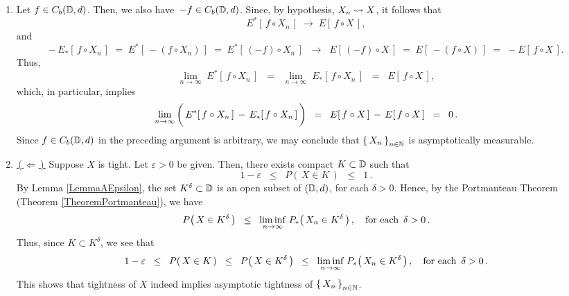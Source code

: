 \begin{enumerate}
\item
	Let $f \in C_{b}(\mathbb{D},d)$. Then, we also have \,$-f \in C_{b}(\mathbb{D},d)$.
	Since, by hypothesis, $X_{n} \rightsquigarrow X$, it follows that
	\begin{equation*}
	E^{*}\!\left[\,f \circ X_{n}\,\right] \;\longrightarrow\; E\!\left[\,f \circ X\,\right],
	\end{equation*}
	and
	\begin{equation*}
	-\,E_{*}\!\left[\,f \circ X_{n}\,\right]
	\;=\; E^{*}\!\left[\,-(f \circ X_{n})\,\right]
	\;=\; E^{*}\!\left[\,(-f) \circ X_{n}\,\right]
	\;\;\longrightarrow\;\;
	E\!\left[\,(-f) \circ X\,\right]
	\;=\; E\!\left[\,-(f \circ X)\,\right]
	\;=\; -E\!\left[\,f \circ X\,\right].
	\end{equation*}
	Thus,
	\begin{equation*}
	\underset{n\rightarrow\infty}{\lim}\;E^{*}\!\left[\,f \circ X_{n}\,\right]
	\;\; = \;\;
	\underset{n\rightarrow\infty}{\lim}\;E_{*}\!\left[\,f \circ X_{n}\,\right]
	\;\; = \;\;
	E\!\left[\,f \circ X\,\right],
	\end{equation*}
	which, in particular, implies
	\begin{equation*}
	\underset{n\rightarrow\infty}{\lim}
		\left(\,
			E^{*}\!\left[\,f \circ X_{n}\,\right]
			\,\overset{{\color{white}+}}{-}\,
			E_{*}\!\left[\,f \circ X_{n}\,\right]
		\,\right)
	\;\; = \;\;
		E\!\left[\,f \circ X\,\right] \,-\, E\!\left[\,f \circ X\,\right]
	\;\; = \;\;
		0\,.
	\end{equation*}
	Since $f \in C_{b}(\mathbb{D},d)$ in the preceding argument is arbitrary,
	we may conclude that $\left\{\,X_{n}\,\right\}_{n\in\mathbb{N}}$ is asymptotically measurable.
\item
	\underline{\,(\,$\Longleftarrow$\,)\,}\;\;
	Suppose $X$ is tight.
	Let $\varepsilon > 0$ be given.
	Then, there exists compact $K \subset \mathbb{D}$ such that
	\begin{equation*}
	1 - \varepsilon \;\;\leq\;\; P\!\left(\,X \in K\,\right) \;\;\leq\;\; 1\,.
	\end{equation*}
	By Lemma \ref{LemmaAEpsilon}, the set $K^{\delta} \subset \mathbb{D}$
	is an open subset of $(\mathbb{D},d)$, for each $\delta > 0$.
	Hence, by the Portmanteau Theorem (Theorem \ref{TheoremPortmanteau}),
	we have
	\begin{equation*}
	P\!\left(\,X \in K^{\delta}\,\right)
	\;\; \leq \;\;
		\underset{n\rightarrow\infty}{\liminf}\;
		P_{*}\!\left(\,X_{n} \in K^{\delta}\,\right),
	\quad
	\textnormal{for each \,$\delta > 0$}\,.
	\end{equation*}
	Thus, since $K \subset K^{\delta}$, we see that
	\begin{equation*}
	1 - \varepsilon
	\;\; \leq \;\;
		P\!\left(\,X \in K\,\right)
	\;\; \leq \;\;
		P\!\left(\,X \in K^{\delta}\,\right)
	\;\; \leq \;\;
		\underset{n\rightarrow\infty}{\liminf}\;
		P_{*}\!\left(\,X_{n} \in K^{\delta}\,\right),
	\quad
	\textnormal{for each \,$\delta > 0$}\,.
	\end{equation*}
	This shows that tightness of $X$ indeed implies asymptotic tightness of
	$\left\{\,X_{n}\,\right\}_{n\in\mathbb{N}}$.
	

\end{enumerate}
